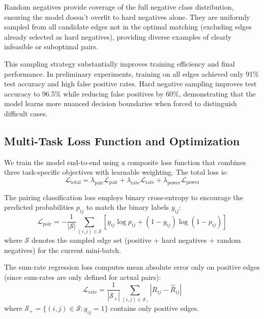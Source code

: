 Random negatives provide coverage of the full negative class distribution, ensuring the model doesn't overfit to hard negatives alone. They are uniformly sampled from all candidate edges not in the optimal matching (excluding edges already selected as hard negatives), providing diverse examples of clearly infeasible or suboptimal pairs.

This sampling strategy substantially improves training efficiency and final performance. In preliminary experiments, training on all edges achieved only 91\% test accuracy and high false positive rates. Hard negative sampling improves test accuracy to 96.5\% while reducing false positives by 60\%, demonstrating that the model learns more nuanced decision boundaries when forced to distinguish difficult cases.

\subsection{Multi-Task Loss Function and Optimization}

We train the model end-to-end using a composite loss function that combines three task-specific objectives with learnable weighting. The total loss is:
\begin{equation}
\mathcal{L}_{\text{total}} = \lambda_{\text{pair}} \mathcal{L}_{\text{pair}} + \lambda_{\text{rate}} \mathcal{L}_{\text{rate}} + \lambda_{\text{power}} \mathcal{L}_{\text{power}}
\end{equation}

The pairing classification loss employs binary cross-entropy to encourage the predicted probabilities $p_{ij}$ to match the binary labels $y_{ij}$:
\begin{equation}
\mathcal{L}_{\text{pair}} = -\frac{1}{|\mathcal{S}|} \sum_{(i,j) \in \mathcal{S}} \left[y_{ij} \log p_{ij} + (1-y_{ij}) \log(1-p_{ij})\right]
\end{equation}
where $\mathcal{S}$ denotes the sampled edge set (positive + hard negatives + random negatives) for the current mini-batch.

The sum-rate regression loss computes mean absolute error only on positive edges (since sum-rates are only defined for actual pairs):
\begin{equation}
\mathcal{L}_{\text{rate}} = \frac{1}{|\mathcal{S}_+|} \sum_{(i,j) \in \mathcal{S}_+} |R_{ij} - \hat{R}_{ij}|
\end{equation}
where $\mathcal{S}_+ = \{(i,j) \in \mathcal{S} : y_{ij} = 1\}$ contains only positive edges.

